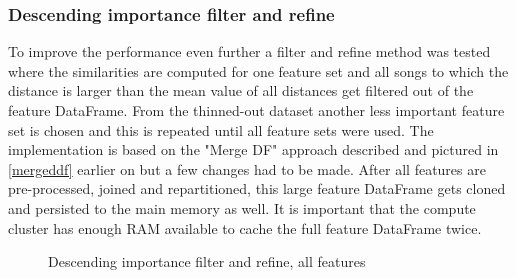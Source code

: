\subsubsection{Descending importance filter and refine}\label{farfs}

To improve the performance even further a filter and refine method was tested where the similarities are computed for one feature set and all songs to which the distance is larger than the mean value of all distances get filtered out of the feature DataFrame. From the thinned-out dataset another less important feature set is chosen and this is repeated until all feature sets were used. 
The implementation is based on the "Merge DF" approach described and pictured in \ref{mergeddf} earlier on but a few changes had to be made. After all features are pre-processed, joined and repartitioned, this large feature DataFrame gets cloned and persisted to the main memory as well. It is important that the compute cluster has enough RAM available to cache the full feature DataFrame twice. 

\FloatBarrier
\begin{figure}[htbp]
   	\centering
   	\caption{Descending importance filter and refine, all features}
   	\label{perfspark5}
\end{figure}
\FloatBarrier

